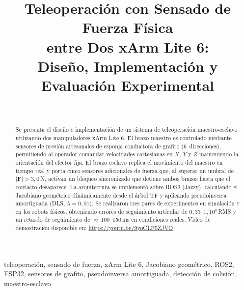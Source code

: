 \documentclass[journal,10pt,twoside]{IEEEtran}
\newcommand{\xarm}{xArm Lite 6}
\newcommand{\ros}{ROS2}
\begin{document}
\title{\color{tec_navy}Teleoperación con Sensado de Fuerza Física\\
  entre Dos \xarm{}:\\
  Diseño, Implementación y Evaluación Experimental}

\author{%
  \\
  }
\maketitle

\begin{abstract}
Se presenta el diseño e implementación de un sistema de teleoperación
maestro-esclavo utilizando dos manipuladores \xarm{}.
El brazo maestro es controlado mediante sensores de presión
artesanales de esponja conductora de grafito (6~direcciones),
permitiendo al operador comandar velocidades cartesianas en $X$,
$Y$ y $Z$ manteniendo la orientación del efector fija.
El brazo esclavo replica el movimiento del maestro en tiempo real
y porta cinco sensores adicionales de fuerza que, al superar un
umbral de $|\bm{F}|>3{,}0$\,N, activan un bloqueo sincronizado
que detiene ambos brazos hasta que el contacto desaparece.
La arquitectura se implementó sobre \ros{} (Jazzy), calculando el
Jacobiano geométrico dinámicamente desde el árbol TF y aplicando
pseudoinversa amortiguada (DLS, $\lambda=0{,}01$).
Se realizaron tres pares de experimentos en simulación y en los
robots físicos, obteniendo errores de seguimiento articular de
$0{,}33$--$1{,}10$°\,RMS y un retardo de seguimiento de
$\approx$\,100--150\,ms en condiciones reales.
Video de demostración disponible en: \url{https://youtu.be/9yoCLF5ZJVQ}
\end{abstract}

\begin{IEEEkeywords}
  teleoperación, sensado de fuerza, \xarm{}, Jacobiano geométrico,
  ROS2, ESP32, sensores de grafito, pseudoinversa amortiguada,
  detección de colisión, maestro-esclavo
\end{IEEEkeywords}
\end{document}
